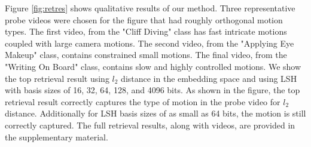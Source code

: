 Figure \ref{fig:retres} shows qualitative results of our method. Three representative probe videos were chosen for the figure that had roughly orthogonal motion types. The first video, from the "Cliff Diving" class has fast intricate motions coupled with large camera motions. The second video, from the "Applying Eye Makeup" class, contains constrained small motions. The final video, from the "Writing On Board" class, contains slow and highly controlled motions. We show the top retrieval result using $l_2$ distance in the embedding space and using LSH with basis sizes of 16, 32, 64, 128, and 4096 bits. As shown in the figure, the top retrieval result correctly captures the type of motion in the probe video for $l_2$ distance. Additionally for LSH basis sizes of as small as 64 bits, the motion is still correctly captured. The full retrieval results, along with videos, are provided in the supplementary material.

